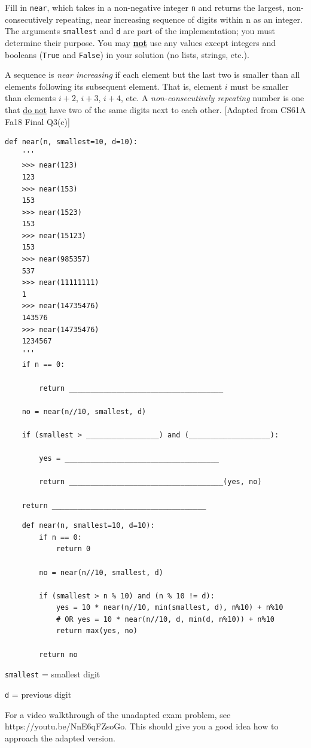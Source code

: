 \begin{blocksection}
    \question
    Fill in \lstinline{near}, which takes in a non-negative integer \lstinline{n} and returns the largest, non-consecutively repeating, near increasing sequence of digits within n as an integer. The arguments \lstinline{smallest} and \lstinline{d} are part of the implementation; you must determine their purpose. You may \underline{\textbf{not}} use any values except
    integers and booleans (\lstinline{True} and \lstinline{False}) in your solution (no lists, strings, etc.).

    A sequence is \textit{near increasing} if each element but the last two is smaller than all elements following its subsequent element. That is, element $i$ must be smaller than elements $i + 2$, $i + 3$, $i + 4$, etc. A \textit{non-consecutively repeating} number is one that \underline{do not} have two of the same digits next to each other. [Adapted from CS61A Fa18 Final Q3(c)]
    
    \begin{lstlisting}
def near(n, smallest=10, d=10):
    '''
    >>> near(123)
    123
    >>> near(153)
    153
    >>> near(1523)
    153
    >>> near(15123)
    153
    >>> near(985357)
    537
    >>> near(11111111)
    1
    >>> near(14735476)
    143576
    >>> near(14735476)
    1234567
    '''
    if n == 0:

        return ____________________________________

    no = near(n//10, smallest, d)

    if (smallest > _________________) and (___________________):
            
        yes = ____________________________________

        return ____________________________________(yes, no)
            
    return ____________________________________
    \end{lstlisting}
    \end{blocksection}
    
    \begin{blocksection}
    \begin{solution}
    \begin{lstlisting}
    def near(n, smallest=10, d=10):
        if n == 0:
            return 0
        
        no = near(n//10, smallest, d)

        if (smallest > n % 10) and (n % 10 != d):
            yes = 10 * near(n//10, min(smallest, d), n%10) + n%10
            # OR yes = 10 * near(n//10, d, min(d, n%10)) + n%10
            return max(yes, no)

        return no

    \end{lstlisting}
    \lstinline{smallest} = smallest digit

    \lstinline{d} = previous digit

    For a video walkthrough of the unadapted exam problem, see https://youtu.be/NnE6qFZsoGo. This should give you a good idea how to approach the adapted version.
    \end{solution}
    \end{blocksection}
    
